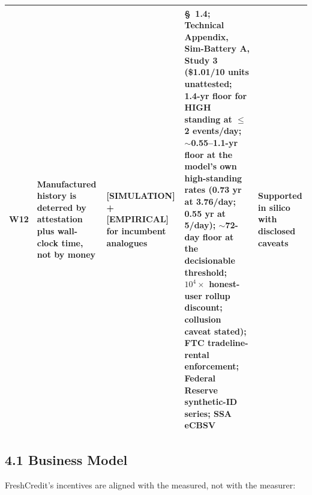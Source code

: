 \documentclass[11pt,twocolumn]{article}
\begin{document}
\begin{table}[t!]
\begin{tabular}{@{}p{} p{} p{} p{} p{}@{}}
W12 & Manufactured history is deterred by attestation plus wall-clock time, not by money & \hspace{0pt}[SIMULATION] + [EMPIRICAL] for incumbent analogues & \S~1.4; Technical Appendix, Sim-Battery A, Study 3 (\$1.01/10 units unattested; 1.4-yr floor for HIGH standing at $\leq$2 events/day; $\sim$0.55--1.1-yr floor at the model's own high-standing rates (0.73 yr at 3.76/day; 0.55 yr at 5/day); $\sim$72-day floor at the decisionable threshold; $10^{4}\times$ honest-user rollup discount; collusion caveat stated); FTC tradeline-rental enforcement; Federal Reserve synthetic-ID series; SSA eCBSV & Supported in silico with disclosed caveats \\
\bottomrule
\end{tabular}
\end{table}

\subsection*{4.1 Business Model}

FreshCredit's incentives are aligned with the measured, not with the measurer:
\end{document}

